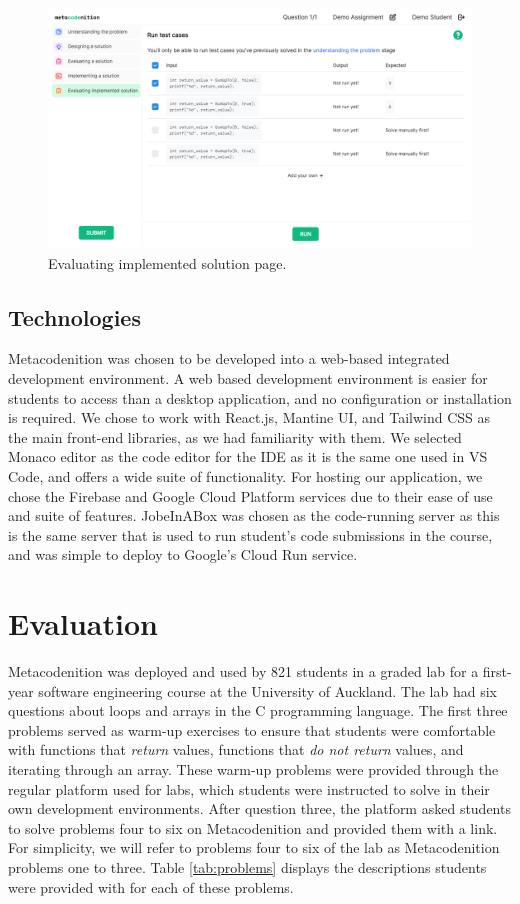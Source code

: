 \documentclass[sigconf,authorversion,nonacm]{acmart}
\begin{document}
\begin{figure}[h!]
  \centering
  \includegraphics[width=\linewidth]{evaluating-implemented-solution}
  \caption{Evaluating implemented solution page.}
  \label{fig:evaluatingimplemented}
\end{figure}

\subsection{Technologies}
Metacodenition was chosen to be developed into a web-based integrated development environment. A web based development environment is easier for students to access than a desktop application, and no configuration or installation is required. We chose to work with React.js, Mantine UI, and Tailwind CSS as the main front-end libraries, as we had familiarity with them. We selected Monaco editor as the code editor for the IDE as it is the same one used in VS Code, and offers a wide suite of functionality. For hosting our application, we chose the Firebase and Google Cloud Platform services due to their ease of use and suite of features. JobeInABox was chosen as the code-running server as this is the same server that is used to run student's code submissions in the course, and was simple to deploy to Google's Cloud Run service.

\section{Evaluation}
Metacodenition was deployed and used by 821 students in a graded lab for a first-year software engineering course at the University of Auckland. The lab had six questions about loops and arrays in the C programming language. The first three problems served as warm-up exercises to ensure that students were comfortable with functions that \emph{return} values, functions that \emph{do not return} values, and iterating through an array. These warm-up problems were provided through the regular platform used for labs, which students were instructed to solve in their own development environments. After question three, the platform asked students to solve problems four to six on Metacodenition and provided them with a link. For simplicity, we will refer to problems four to six of the lab as Metacodenition problems one to three. Table \ref{tab:problems} displays the descriptions students were provided with for each of these problems.
\end{document}
